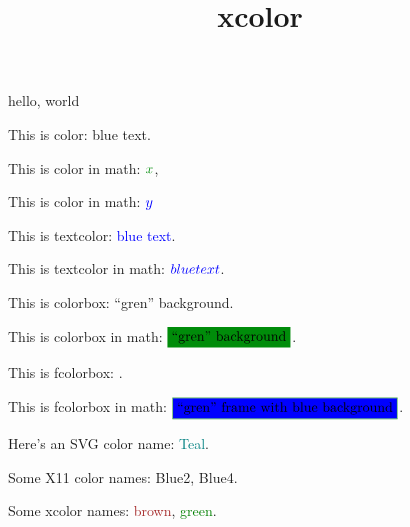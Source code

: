 \documentclass{amsart}
\title{xcolor}
\begin{document}
\maketitle

hello, world



This is color: {\color{blue} blue text}.  

This is color in math: $\color{gren} x$,

This is color in math: $\color{blue} y$

This is textcolor: \textcolor{blue}{blue text}.

This is textcolor in math: $\textcolor{blue}{blue text}$.

This is colorbox: \colorbox{gren}{``gren'' background}.

This is colorbox in math: $\colorbox{gren}{``gren'' background}$.

This is fcolorbox: .

This is fcolorbox in math: $\fcolorbox{gren}{blue}{``gren'' frame with blue background}$.

Here's an SVG color name: \textcolor{Teal}{Teal}.

Some X11 color names: \textcolor{Blue2}{Blue2}, \textcolor{Blue4}{Blue4}.

Some xcolor names: \textcolor{brown}{brown}, \textcolor{green}{green}.
\end{document}
